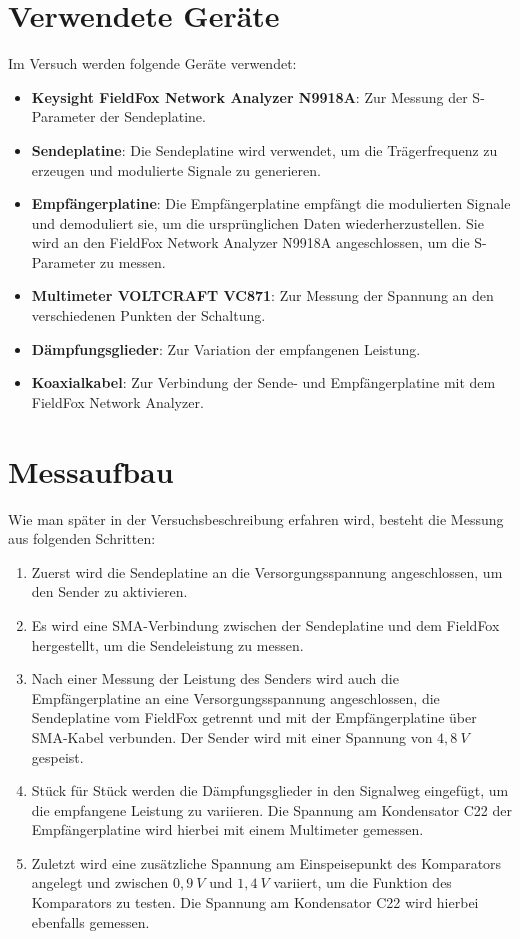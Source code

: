 \section{Verwendete Geräte}
Im Versuch werden folgende Geräte verwendet:
\begin{itemize}
    \item \textbf{Keysight FieldFox Network Analyzer N9918A}: Zur Messung der S-Parameter der Sendeplatine.
    \item \textbf{Sendeplatine}: Die Sendeplatine wird verwendet, um die Trägerfrequenz zu erzeugen und modulierte Signale zu generieren.
    \item \textbf{Empfängerplatine}: Die Empfängerplatine empfängt die modulierten Signale und demoduliert sie, um die ursprünglichen Daten wiederherzustellen. Sie wird an den FieldFox Network Analyzer N9918A angeschlossen, um die S-Parameter zu messen.
    \item \textbf{Multimeter VOLTCRAFT VC871}: Zur Messung der Spannung an den verschiedenen Punkten der Schaltung.
    \item \textbf{Dämpfungsglieder}: Zur Variation der empfangenen Leistung.
    \item \textbf{Koaxialkabel}: Zur Verbindung der Sende- und Empfängerplatine mit dem FieldFox Network Analyzer.
\end{itemize}
\section{Messaufbau}
Wie man später in der Versuchsbeschreibung erfahren wird, besteht die Messung aus folgenden Schritten:
\begin{enumerate}
    \item Zuerst wird die Sendeplatine an die Versorgungsspannung angeschlossen, um den Sender zu aktivieren.
    \item Es wird eine SMA-Verbindung zwischen der Sendeplatine und dem FieldFox hergestellt, um die Sendeleistung zu messen.
    \item Nach einer Messung der Leistung des Senders wird auch die Empfängerplatine an eine Versorgungsspannung angeschlossen, die Sendeplatine vom FieldFox getrennt und mit der Empfängerplatine über SMA-Kabel verbunden. Der Sender wird mit einer Spannung von $4,8~V$ gespeist.
    \item Stück für Stück werden die Dämpfungsglieder in den Signalweg eingefügt, um die empfangene Leistung zu variieren. Die Spannung am Kondensator C22 der Empfängerplatine wird hierbei mit einem Multimeter gemessen.
    \item Zuletzt wird eine zusätzliche Spannung am Einspeisepunkt des Komparators angelegt und zwischen $0,9~V$ und $1,4~V$ variiert, um die Funktion des Komparators zu testen. Die Spannung am Kondensator C22 wird hierbei ebenfalls gemessen.
\end{enumerate}
\clearpage